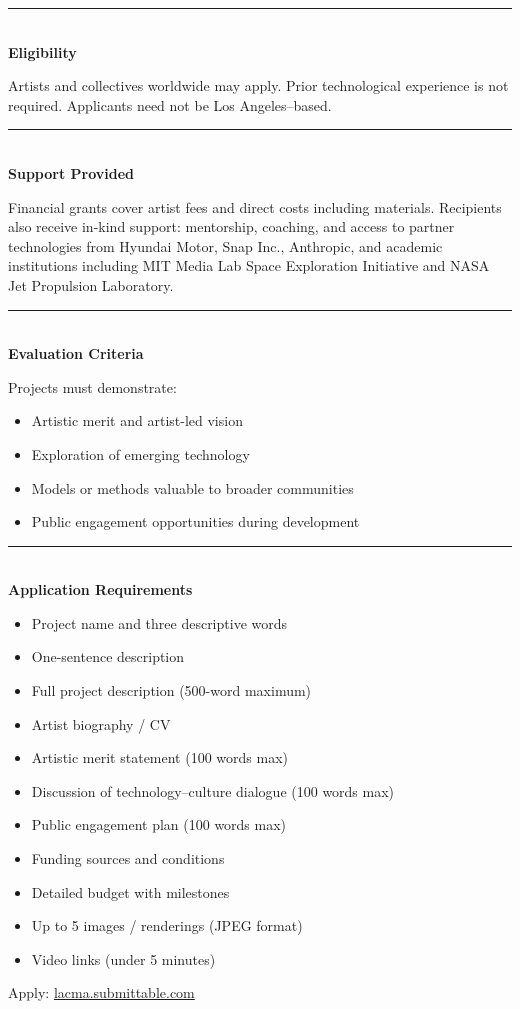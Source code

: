 \documentclass[12pt,letterpaper]{article}
\newcommand{\acsubhead}[1]{%
  \vspace{1em}%
  {\color{acgray}\noindent\rule{4cm}{0.5pt}}\\[0.3em]
  {\bfseries #1}%
  \vspace{0.3em}%
}
\begin{document}
\acsubhead{Eligibility}

Artists and collectives worldwide may apply. Prior technological experience is not required. Applicants need not be Los Angeles--based.

\acsubhead{Support Provided}

Financial grants cover artist fees and direct costs including materials. Recipients also receive in-kind support: mentorship, coaching, and access to partner technologies from Hyundai Motor, Snap Inc., Anthropic, and academic institutions including MIT Media Lab Space Exploration Initiative and NASA Jet Propulsion Laboratory.

\acsubhead{Evaluation Criteria}

Projects must demonstrate:
\begin{itemize}
  \item Artistic merit and artist-led vision
  \item Exploration of emerging technology
  \item Models or methods valuable to broader communities
  \item Public engagement opportunities during development
\end{itemize}

\acsubhead{Application Requirements}

\begin{itemize}
  \item Project name and three descriptive words
  \item One-sentence description
  \item Full project description (500-word maximum)
  \item Artist biography / CV
  \item Artistic merit statement (100 words max)
  \item Discussion of technology--culture dialogue (100 words max)
  \item Public engagement plan (100 words max)
  \item Funding sources and conditions
  \item Detailed budget with milestones
  \item Up to 5 images / renderings (JPEG format)
  \item Video links (under 5 minutes)
\end{itemize}

\vfill
\begin{center}
  \color{acgray}
  Apply: \href{https://lacma.submittable.com/submit/348727/2026-art-technology-lab-grants}{lacma.submittable.com}
\end{center}
\end{document}
